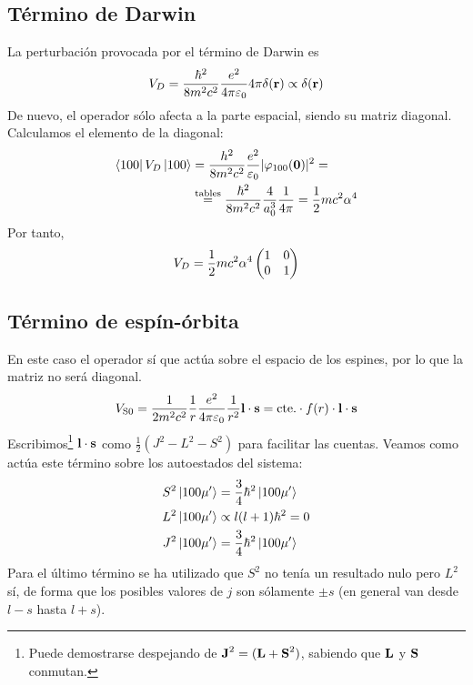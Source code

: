 \subsection{Término de Darwin}
La perturbación provocada por el término de Darwin es
\begin{equation}
  V_D =
  \frac{\hbar^2}{8m^2c^2}\frac{e^2}{4\pi\varepsilon_0}4\pi\delta(\bm{\mathrm{r}})
  \propto \delta(\bm{\mathrm{r}})
\end{equation}
De nuevo, el operador sólo afecta a la parte espacial, siendo su
matriz diagonal. Calculamos el elemento de la diagonal:
\begin{equation}
  \begin{split}
    \bra{100}V_D\ket{100} &=
    \frac{h^2}{8m^2c^2}\frac{e^2}{\varepsilon_0}|\varphi_{100}(\bm{\mathrm{0}})|^2
    =\\ & \stackrel{\text{tables}}{=}
    \frac{\hbar^2}{8m^2c^2}\frac{4}{a_0^3}\frac{1}{4\pi} = \frac{1}{2}mc^2\alpha^4
  \end{split}
\end{equation}
 Por tanto,
\begin{equation}
  V_D = \frac{1}{2}mc^2\alpha^4
  \begin{pmatrix}
\imat{2}
  \end{pmatrix}
\end{equation}

\subsection{Término de espín-órbita}
\label{subs:SOfirst}
En este caso el operador sí que actúa sobre el espacio de los espines,
por lo que la matriz no será diagonal.
\begin{equation}
  V_\text{S0} =
  \frac{1}{2m^2c^2}\frac{1}{r}\frac{e^2}{4\pi\varepsilon_0}\frac{1}{r^2}\bm{\mathrm{l}}\cdot
  \bm{\mathrm{s}} = \text{cte.}\cdot f(r) \cdot \bm{\mathrm{l}}\cdot \bm{\mathrm{s}}
\end{equation}
Escribimos\footnote{Puede demostrarse despejando de $\bm{\mathrm{J}}^2 =
  (\bm{\mathrm{L}}+\bm{\mathrm{S}}^2)$, sabiendo que $\bm{\mathrm{L}}$ y $\bm{\mathrm{S}}$
  conmutan.} $\bm{\mathrm{l}}\cdot \bm{\mathrm{s}}$ como
$\frac{1}{2}(J^2-L^2-S^2)$ para facilitar las cuentas. Veamos como
actúa este término sobre los autoestados del sistema:
\begin{align}
  S^2 \ket{100\mu'} &= \frac{3}{4}\hbar^2 \ket{100\mu'}\\
  L^2 \ket{100\mu'} &\propto l(l+1)\hbar^2 = 0 \\
  J^2 \ket{100\mu'} &= \frac{3}{4}\hbar^2 \ket{100\mu'}
\end{align}
Para el último término se ha utilizado que $S^2$ no tenía un resultado
nulo pero $L^2$ sí, de forma que los posibles valores de $j$ son
sólamente $\pm s$ (en general van desde $l-s$ hasta $l+s$).

